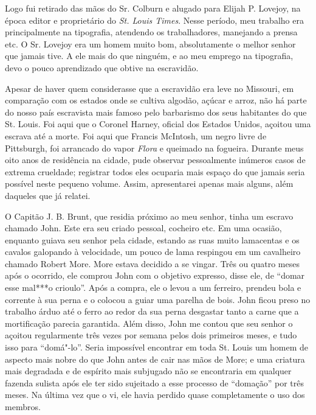 Logo fui retirado das mãos do Sr. Colburn e alugado para Elijah P.
Lovejoy, na época editor e proprietário do \emph{St. Louis Times}. Nesse
período, meu trabalho era principalmente na tipografia, atendendo os
trabalhadores, manejando a prensa etc. O Sr. Lovejoy era um homem muito
bom, absolutamente o melhor senhor que jamais tive. A ele mais do que
ninguém, e ao meu emprego na tipografia, devo o pouco aprendizado que
obtive na escravidão.

Apesar de haver quem considerasse que a escravidão era leve no Missouri,
em comparação com os estados onde se cultiva algodão, açúcar e arroz,
não há parte do nosso país escravista mais famoso pelo barbarismo dos
seus habitantes do que St. Louis. Foi aqui que o Coronel Harney, oficial
dos Estados Unidos, açoitou uma escrava até a morte. Foi aqui que
Francis McIntosh, um negro livre de Pittsburgh, foi arrancado do vapor
\emph{Flora} e queimado na fogueira. Durante meus oito anos de
residência na cidade, pude observar pessoalmente inúmeros casos de
extrema crueldade; registrar todos eles ocuparia mais espaço do que
jamais seria possível neste pequeno volume. Assim, apresentarei apenas
mais alguns, além daqueles que já relatei.

O Capitão J. B. Brunt, que residia próximo ao meu senhor, tinha um
escravo chamado John. Este era seu criado pessoal, cocheiro etc. Em uma
ocasião, enquanto guiava seu senhor pela cidade, estando as ruas muito
lamacentas e os cavalos galopando à velocidade, um pouco de lama
respingou em um cavalheiro chamado Robert More. More estava decidido a
se vingar. Três ou quatro meses após o ocorrido, ele comprou John com o
objetivo expresso, disse ele, de ``domar esse mal***o crioulo''. Após a
compra, ele o levou a um ferreiro, prendeu bola e corrente à sua perna e
o colocou a guiar uma parelha de bois. John ficou preso no trabalho
árduo até o ferro ao redor da sua perna desgastar tanto a carne que a
mortificação parecia garantida. Além disso, John me contou que seu
senhor o açoitou regularmente três vezes por semana pelos dois primeiros
meses, e tudo isso para ``domá"-lo''. Seria impossível encontrar em toda
St. Louis um homem de aspecto mais nobre do que John antes de cair nas
mãos de More; e uma criatura mais degradada e de espírito mais subjugado
não se encontraria em qualquer fazenda sulista após ele ter sido
sujeitado a esse processo de ``domação'' por três meses. Na última vez
que o vi, ele havia perdido quase completamente o uso dos membros.

